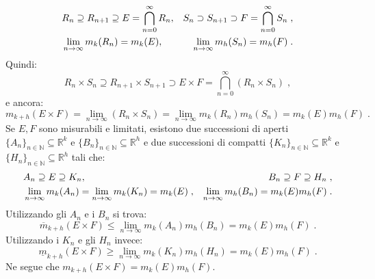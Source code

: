 \documentclass[a4paper,12pt]{report}
\theoremstyle{plain}
\theoremstyle{definition}
\theoremstyle{remark}
\numberwithin{equation}{section}
\begin{document}
\begin{align}
&R_n\supseteq R_{n+1}\supseteq E=\bigcap_{n=0}^{\infty} R_n, &S_n\supset S_{n+1}\supset F=\bigcap_{n=0}^{\infty} S_n\;, \notag \\
&\lim_{n\to\infty}m_k(R_n)=m_k(E), &\lim_{n\to\infty}m_h(S_n)=m_h(F)\;.
\end{align}
Quindi:
\begin{equation}
R_n\times S_n\supseteq R_{n+1}\times S_{n+1}\supset E\times F=\bigcap_{n=0}^{\infty}(R_n\times S_n)\;,
\end{equation}
e ancora:
\begin{equation}
m_{k+h}(E\times F)=\lim_{n\to\infty}(R_n\times S_n)=\lim_{n\to\infty}m_k(R_n)m_h(S_n)=m_k(E)m_h(F)\;.
\end{equation}
Se $E,F$ sono misurabili e limitati, esistono due successioni di aperti $\{A_n\}_{n\in\mathbb{N}}\subseteq \mathbb{R}^k$ e $\{B_n\}_{n\in
\mathbb{N}}\subseteq \mathbb{R}^h$ e due successioni di compatti $\{K_n\}_{n\in\mathbb{N}}\subseteq \mathbb{R}^k$ e $\{H_n\}_{n\in\mathbb{N}}\subseteq \mathbb{R}^h$ tali che:
\begin{align}
&A_n\supseteq E\supseteq K_n, &B_n\supseteq F\supseteq H_n\;, \notag \\
&\lim_{n\to\infty}m_k(A_n)=\lim_{n\to\infty}m_k(K_n)=m_k(E)\;, &\lim_{n\to\infty}m_h(B_n)=m_k(E)m_h(F)\;.
\end{align}
Utilizzando gli $A_n$ e i $B_n$ si trova:
\begin{equation}
\overline{m}_{k+h}(E\times F)\le \lim_{n\to\infty}m_k(A_n)m_h(B_n)=m_k(E)m_h(F)\;.
\end{equation}
Utilizzando i $K_n$ e gli $H_n$ invece:
\begin{equation}
\underline{m}_{k+h}(E\times F)\ge \lim_{n\to\infty}m_k(K_n)m_h(H_n)=m_k(E)m_h(F)\;.
\end{equation}
Ne segue che $m_{k+h}(E\times F)=m_k(E)m_h(F)$. \\
\end{document}
